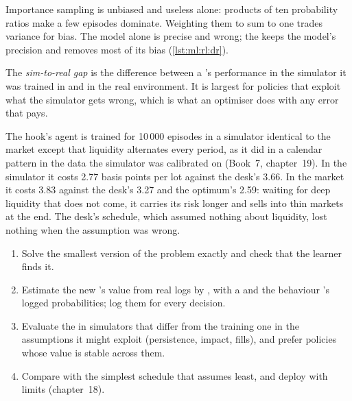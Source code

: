 Importance sampling is unbiased and useless alone: products of ten probability ratios make a few episodes dominate. Weighting
them to sum to one trades variance for bias. The model alone is precise and wrong; the  keeps the
model's precision and removes most of its bias (\cref{lst:ml:rl:dr}).

\begin{definition}\label{def:ml:reinforcement-learning-foundations:simreal}
The \emph{sim-to-real gap} is the difference between a 's performance in the simulator it was
trained in and in the real environment. It is largest for policies that exploit what the simulator gets wrong, which is
what an optimiser does with any error that pays.
\end{definition}

The hook's agent is  trained for 10\,000 episodes in a simulator identical to the market except that liquidity
alternates every period, as it did in a calendar pattern in the data the simulator was calibrated on (Book~7, chapter~19). In
the simulator it costs 2.77 basis points per lot against the desk's 3.66. In the market it costs 3.83 against the desk's
3.27 and the optimum's 2.59: waiting for deep liquidity that does not come, it carries its risk longer and sells into thin
markets at the end. The desk's schedule, which assumed nothing about liquidity, lost nothing when the assumption was wrong.

\begin{method}\label{met:ml:rl:method}
\begin{enumerate}
\item Solve the smallest version of the problem exactly and check that the learner finds it.
\item Estimate the new 's value from real logs by , with a  and the
behaviour 's logged probabilities; log them for every decision.
\item Evaluate the  in simulators that differ from the training one in the assumptions it might exploit (persistence,
impact, fills), and prefer policies whose value is stable across them.
\item Compare with the simplest schedule that assumes least, and deploy with limits (chapter~18).
\end{enumerate}
\end{method}


